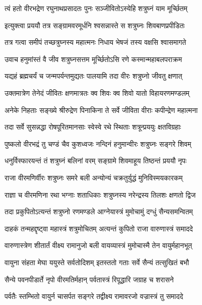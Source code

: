 \twolineshloka
{त्वं हतो वीरभद्रेण रघुनाथप्रसादतः}
{पुनः सञ्जीवितोऽस्येहि शत्रुघ्नं याम मूर्च्छितम्}%

\twolineshloka
{इत्युक्त्वा प्रययौ तत्र सङ्ग्रामवरमूर्धनि}
{श्वसन्नास्ते स शत्रुघ्नः शिवबाणप्रपीडितः}%

\twolineshloka
{तत्र गत्वा समीपं तच्छत्रुघ्नस्य महात्मनः}
{निधाय भेषजं तस्य वक्षसि श्वासमागते}%

\twolineshloka
{उवाच हनुमांस्तं वै जीव शत्रुघ्नसत्तम}
{मूर्च्छितोऽसि रणे कस्मान्महाबलपराक्रम}%

\twolineshloka
{यद्यहं ब्रह्मचर्यं च जन्मपर्यन्तमुद्यतः}
{पालयामि तदा वीरः शत्रुघ्नो जीवतु क्षणात्}%

\twolineshloka
{उक्तमात्रेण तेनेदं जीवितः क्षणमात्रतः}
{क्व शिवः क्व शिवो यातो विहायरणमण्डलम्}%

\twolineshloka
{अनेके निहताः सङ्ख्ये श्रीरुद्रेण पिनाकिना}
{ते सर्वे जीविता वीराः कपीन्द्रेण महात्मना}%

\twolineshloka
{तदा सर्वे सुसन्नद्धा रोषपूरितमानसाः}
{स्वेस्वे रथे स्थिताः शत्रून्प्रययुः क्षतविग्रहाः}%

\twolineshloka
{पुष्कलो वीरभद्रं तु चण्डं चैव कुशध्वजः}
{नन्दिनं हनुमान्वीरः शत्रुघ्नः सङ्गरे शिवम्}%

\twolineshloka
{धनुर्विस्फारयन्तं तं शत्रुघ्नं बलिनां वरम्}
{सङ्ग्रामे शिवमाहूय तिष्ठन्तं प्रययौ नृपः}%

\twolineshloka
{राजा वीरमणिर्वीरः शत्रुघ्नः समरे बली}
{अन्योन्यं चक्रतुर्युद्धं मुनिविस्मयकारकम्}%

\twolineshloka
{राज्ञा च वीरमणिना रथा भग्नाः शताधिकाः}
{शत्रुघ्नस्य नरेन्द्रस्य तिलशः क्षणतो द्विज}%

\twolineshloka
{तदा प्रकुपितोऽत्यन्तं शत्रुघ्नो रणमण्डले}
{आग्नेयास्त्रं मुमोचामुं दग्धुं सैन्यसमन्वितम्}%

\twolineshloka
{दाहकं तन्महद्दृष्ट्वा महास्त्रं शत्रुमोचितम्}
{अत्यन्तं कुपितो राजा वारुणास्त्रं समाददे}%

\twolineshloka
{वारुणास्त्रेण शीतार्तं वीक्ष्य रामानुजो बली}
{वायव्यास्त्रं मुमोचास्मै तेन वायुर्महानभूत्}%

\twolineshloka
{वायुना संहता मेघा ययुस्ते सर्वतोदिशम्}
{इतस्ततो गताः सर्वे सैन्यं तत्सुखितं बभौ}%

\twolineshloka
{सैन्ये पवनपीडार्ते नृपो वीरमतिर्महान्}
{पर्वतास्त्रं रिपूद्धारि जग्राह च शरासने}%

\twolineshloka
{पर्वतैः स्तम्भितो वायुर्न चासर्पत सङ्गरे}
{तद्वीक्ष्य रामावरजो वज्रास्त्रं तु समाददे}%

